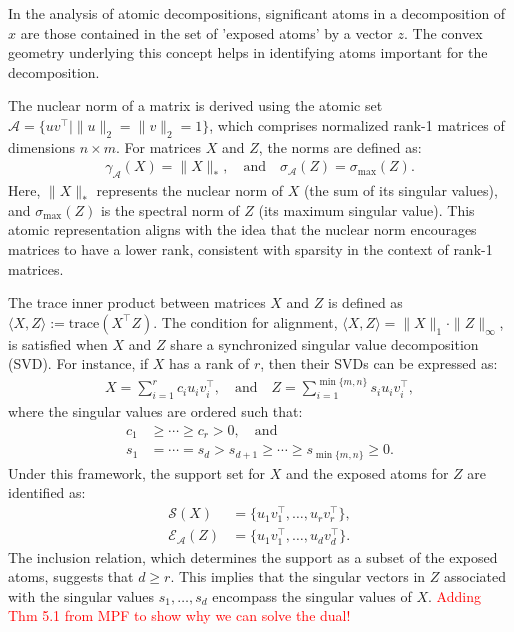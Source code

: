 \documentclass[10pt, twocolumn, reqno, a4paper,oneside]{amsart}
\numberwithin{equation}{section}
\numberwithin{theorem}{section}
\numberwithin{figure}{section}
\numberwithin{table}{section}
\numberwithin{theorem}{section}
\numberwithin{equation}{section}
\begin{document}
In the analysis of atomic decompositions, significant atoms in a decomposition of $x$ are those contained in the set of 'exposed atoms' by a vector $z$. The convex geometry underlying this concept helps in identifying atoms important for the decomposition.

The nuclear norm of a matrix is derived using the atomic set $\mathcal{A} = \{uv^\top | \|u\|_2 = \|v\|_2 = 1\}$, which comprises normalized rank-1 matrices of dimensions $n \times m$. For matrices $X$ and $Z$, the norms are defined as:
\begin{align*}
	\mathcal{\gamma}_\mathcal{A}(X)= \|X\|_*, \quad \text{and} \quad
	\sigma_\mathcal{A}(Z) = \sigma_{\text{max}}(Z).
\end{align*}
Here, $\|X\|_*$ represents the nuclear norm of $X$ (the sum of its singular values), and $\sigma_{\text{max}}(Z)$ is the spectral norm of $Z$ (its maximum singular value). This atomic representation aligns with the idea that the nuclear norm encourages matrices to have a lower rank, consistent with sparsity in the context of rank-1 matrices.

The trace inner product between matrices $X$ and $Z$ is defined as $\langle X, Z \rangle := \text{trace}(X^\top Z)$. The condition for alignment, $\langle X, Z \rangle = \|X\|_1 \cdot \|Z\|_\infty$, is satisfied when $X$ and $Z$ share a synchronized singular value decomposition (SVD). For instance, if $X$ has a rank of $r$, then their SVDs can be expressed as:
\begin{align*}
	X = \sum_{i=1}^r c_i u_iv_i^\top, \quad \text{and} \quad
	Z = \sum_{i=1}^{\min\{m,n\}} s_iu_iv_i^\top,
\end{align*}
where the singular values are ordered such that:
\begin{align*}
	c_1 &\geq \cdots \geq c_r > 0, \quad \text{and} \quad \\
	s_1 &= \cdots = s_d > s_{d+1} \geq \cdots \geq s_{\min\{m,n\}} \geq 0.
\end{align*}
Under this framework, the support set for $X$ and the exposed atoms for $Z$ are identified as:
\begin{equation}
	\begin{aligned}
		\mathcal{S}(X) &= \{u_1v_1^\top, \ldots, u_rv_r^\top\}, \\
		\mathcal{E}_\mathcal{A}(Z) &= \{u_1v_1^\top, \ldots, u_dv_d^\top\}.
	\end{aligned} \label{eq:multipl}
\end{equation}
The inclusion relation, which determines the support as a subset of the exposed atoms, suggests that $d \geq r$. This implies that the singular vectors in $Z$ associated with the singular values $s_1, \ldots, s_d$ encompass the singular values of $X$.
\textcolor{red}{Adding Thm 5.1 from MPF to show why we can solve the dual!}
\end{document}
